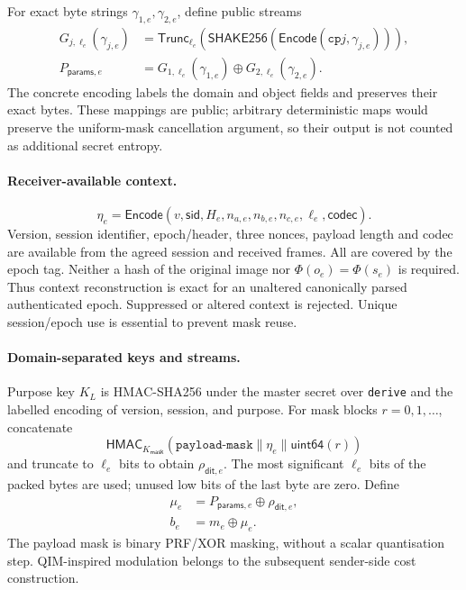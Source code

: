\documentclass[journal]{IEEEtran}
\theoremstyle{definition}
\theoremstyle{game}
\begin{document}
For exact byte strings $\gamma_{1,e},\gamma_{2,e}$, define public streams
\begin{align}\label{supp-eq:qim-parameter-extraction}
G_{j,\ell_e}(\gamma_{j,e})&=
 \mathsf{Trunc}_{\ell_e}\!\left(\mathsf{SHAKE256}
 (\mathsf{Encode}(\texttt{cp}j,\gamma_{j,e}))\right),\nonumber\\
P_{\mathsf{params},e}&=G_{1,\ell_e}(\gamma_{1,e})\oplus G_{2,\ell_e}(\gamma_{2,e}).
\end{align}
The concrete encoding labels the domain and object fields and preserves
their exact bytes. These mappings are public; arbitrary deterministic maps
would preserve the uniform-mask cancellation argument, so their output is
not counted as additional secret entropy.

\paragraph{Receiver-available context.}
\begin{equation}\label{supp-eq:qim-mask-context}
\eta_e=\mathsf{Encode}(v,\mathsf{sid},H_e,n_{a,e},n_{b,e},n_{c,e},\ell_e,\mathsf{codec}).
\end{equation}
Version, session identifier, epoch/header, three nonces, payload length and
codec are available from the agreed session and received frames. All are
covered by the epoch tag. Neither a hash of the original image nor
$\Phi(o_e)=\Phi(s_e)$ is required. Thus context reconstruction is exact for
an unaltered canonically parsed authenticated epoch. Suppressed or altered
context is rejected. Unique session/epoch use is essential to prevent mask reuse.

\paragraph{Domain-separated keys and streams.}
Purpose key $K_L$ is HMAC-SHA256 under the master secret over
\texttt{derive} and the labelled encoding of version, session, and purpose.
For mask blocks $r=0,1,\ldots$, concatenate
\begin{equation}\label{supp-eq:qim-mask-seed}
\mathsf{HMAC}_{K_{\mathsf{mask}}}
 (\texttt{payload-mask}\parallel\eta_e\parallel\mathsf{uint64}(r))
\end{equation}
and truncate to $\ell_e$ bits to obtain $\rho_{\mathsf{dit},e}$.
The most significant $\ell_e$ bits of the packed bytes are used; unused
low bits of the last byte are zero. Define
\begin{align}\label{supp-eq:qim-cover-parameter-bits}
\mu_e&=P_{\mathsf{params},e}\oplus\rho_{\mathsf{dit},e},\\
\label{supp-eq:qim-theoretical-masked-payload}
b_e&=m_e\oplus\mu_e.
\end{align}
The payload mask is binary PRF/XOR masking, without a scalar
quantisation step. QIM-inspired
modulation belongs to the subsequent sender-side cost construction.
\end{document}
